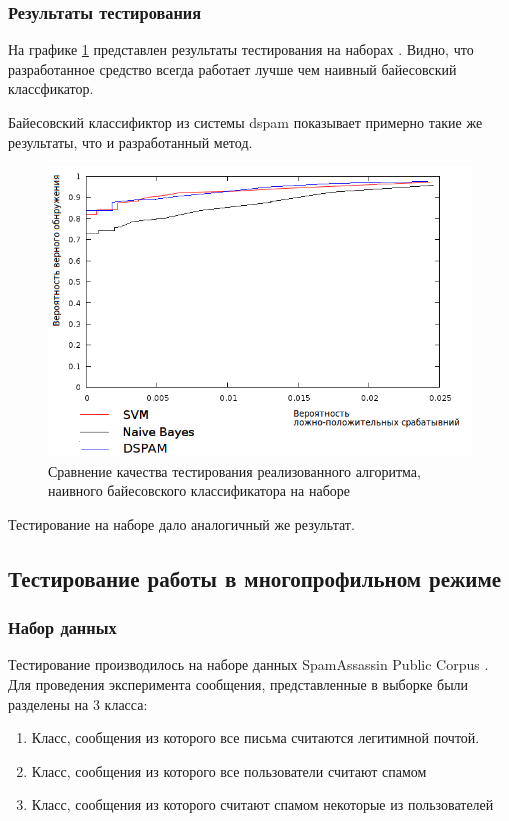 \subsubsection{Результаты тестирования}
На графике \ref{SAPCBAYESSVM}  представлен результаты тестирования на наборах \cite{SAPC}. Видно, что разработанное средство всегда работает лучше чем наивный байесовский классфикатор.

Байесовский классификтор из системы dspam показывает примерно такие же результаты, что и разработанный метод.
\begin{figure}[h]
\begin{center}
\includegraphics[width=15cm]{img/graphic}
\end{center}
\caption{Сравнение качества тестирования реализованного алгоритма, наивного байесовского классификатора на наборе\cite{SAPC}}
\label{SAPCBAYESSVM}
\end{figure}

Тестирование на наборе \cite{CEAS} дало аналогичный же результат.

\subsection{Тестирование работы в многопрофильном режиме}

\subsubsection{Набор данных}
Тестирование производилось на наборе данных SpamAssassin Public Corpus \cite{SAPC}.
Для проведения эксперимента сообщения, представленные в выборке были разделены на 3 класса:
\begin{enumerate}
\item Класс, сообщения из которого все письма считаются легитимной почтой.
\item Класс, сообщения из которого все пользователи считают спамом
\item Класс, сообщения из которого считают спамом некоторые из пользователей
\end{enumerate}

